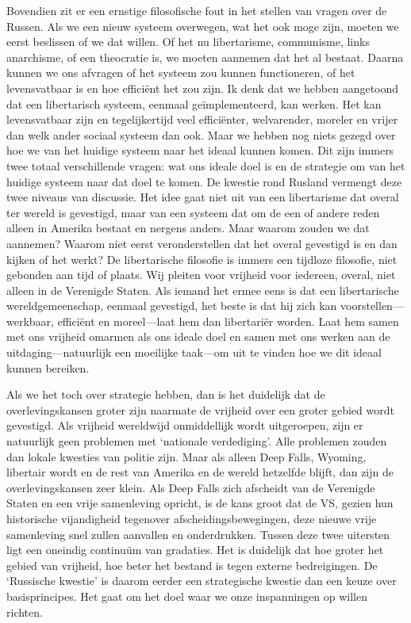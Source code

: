 \documentclass[
  a5paper,
  smalldemyvopaper,10pt,twoside,onecolumn,openright,extrafontsizes,hidelinks]{memoir}
\begin{document}
Bovendien zit er een ernstige filosofische fout in het stellen van
vragen over de Russen. Als we een nieuw systeem overwegen, wat het ook
moge zijn, moeten we eerst beslissen of we dat willen. Of het nu
libertarisme, communisme, links anarchisme, of een theocratie is, we
moeten aannemen dat het al bestaat. Daarna kunnen we ons afvragen of het
systeem zou kunnen functioneren, of het levensvatbaar is en hoe
efficiënt het zou zijn. Ik denk dat we hebben aangetoond dat een
libertarisch systeem, eenmaal geïmplementeerd, kan werken. Het kan
levensvatbaar zijn en tegelijkertijd veel efficiënter, welvarender,
moreler en vrijer dan welk ander sociaal systeem dan ook. Maar we hebben
nog niets gezegd over hoe we van het huidige systeem naar het ideaal
kunnen komen. Dit zijn immers twee totaal verschillende vragen: wat ons
ideale doel is en de strategie om van het huidige systeem naar dat doel
te komen. De kwestie rond Rusland vermengt deze twee niveaus van
discussie. Het idee gaat niet uit van een libertarisme dat overal ter
wereld is gevestigd, maar van een systeem dat om de een of andere reden
alleen in Amerika bestaat en nergens anders. Maar waarom zouden we dat
aannemen? Waarom niet eerst veronderstellen dat het overal gevestigd is
en dan kijken of het werkt? De libertarische filosofie is immers een
tijdloze filosofie, niet gebonden aan tijd of plaats. Wij pleiten voor
vrijheid voor iedereen, overal, niet alleen in de Verenigde Staten. Als
iemand het ermee eens is dat een libertarische wereldgemeenschap,
eenmaal gevestigd, het beste is dat hij zich kan voorstellen---werkbaar,
efficiënt en moreel---laat hem dan libertariër worden. Laat hem samen
met ons vrijheid omarmen als ons ideale doel en samen met ons werken aan
de uitdaging---natuurlijk een moeilijke taak---om uit te vinden hoe we
dit ideaal kunnen bereiken.

Als we het toch over strategie hebben, dan is het duidelijk dat de
overlevingskansen groter zijn naarmate de vrijheid over een groter
gebied wordt gevestigd. Als vrijheid wereldwijd onmiddellijk wordt
uitgeroepen, zijn er natuurlijk geen problemen met `nationale
verdediging'. Alle problemen zouden dan lokale kwesties van politie
zijn. Maar als alleen Deep Falls, Wyoming, libertair wordt en de rest
van Amerika en de wereld hetzelfde blijft, dan zijn de overlevingskansen
zeer klein. Als Deep Falls zich afscheidt van de Verenigde Staten en een
vrije samenleving opricht, is de kans groot dat de VS, gezien hun
historische vijandigheid tegenover afscheidingsbewegingen, deze nieuwe
vrije samenleving snel zullen aanvallen en onderdrukken. Tussen deze
twee uitersten ligt een oneindig continuüm van gradaties. Het is
duidelijk dat hoe groter het gebied van vrijheid, hoe beter het bestand
is tegen externe bedreigingen. De `Russische kwestie' is daarom eerder
een strategische kwestie dan een keuze over basisprincipes. Het gaat om
het doel waar we onze inspanningen op willen richten.
\end{document}
